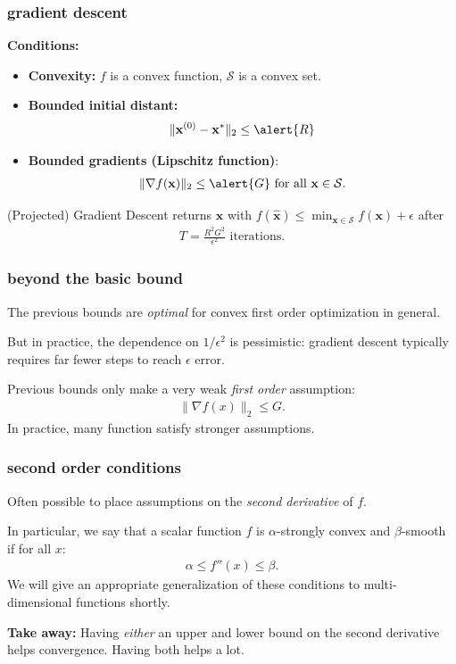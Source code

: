 \documentclass[compress]{beamer}
\newcommand{\bv}[1]{\mathbf{#1}}
\begin{document}
\begin{frame}[t]
	\frametitle{gradient descent}
	\textbf{Conditions:}
	\begin{itemize}
		\item \textbf{Convexity:} $f$ is a convex function, $\mathcal{S}$ is a convex set. 
		\item \textbf{Bounded initial distant:} 
		\begin{align*}
			\|\bv{x}^{(0)} - \bv{x}^*\|_2 \leq \alert{R}
		\end{align*}
		\item \textbf{Bounded gradients (Lipschitz function)}: 
		\begin{align*}
			\|\nabla f(\bv{x})\|_2 \leq \alert{G} \text{ for all } \bv{x}\in \mathcal{S}.
		\end{align*}
	\end{itemize}
	
	\begin{theorem}
		(Projected) Gradient Descent returns $\hat{\bv{x}}$ with $f(\hat{\bv{x}}) \leq \min_{\bv{x}\in \mathcal{S}}f(\bv{x})+\epsilon$ after
		\begin{align*}
			T = \frac{R^2 G^2}{\epsilon^2} \text{ iterations.}
		\end{align*}
	\end{theorem}
\end{frame}

\begin{frame}
	\frametitle{beyond the basic bound}
	The previous bounds are \emph{optimal} for convex first order optimization in general. 
	
	But in practice, the dependence on $1/\epsilon^2$ is  pessimistic: gradient descent typically requires far fewer steps to reach $\epsilon$ error. 

	Previous bounds only make a very weak \emph{first order} assumption: 
	\begin{align*}
		\|\nabla f(x)\|_2 \leq G.
	\end{align*}
	In practice, many function satisfy stronger assumptions. 
\end{frame}

\begin{frame}
	\frametitle{second order conditions}
	Often possible to place assumptions on the \emph{second derivative} of $f$. 
	
	In particular, we say that a scalar function $f$ is \alert{$\alpha$-strongly convex} and \alert{$\beta$-smooth} if for all $x$:
	\begin{align*}
		\alpha \leq f''(x) \leq \beta.
	\end{align*}
\alert{We will give an appropriate generalization of these conditions to multi-dimensional functions shortly.}

	\textbf{Take away:} Having \emph{either} an upper and lower bound on the second derivative helps convergence. Having both helps a lot.
\end{frame}
\end{document}
